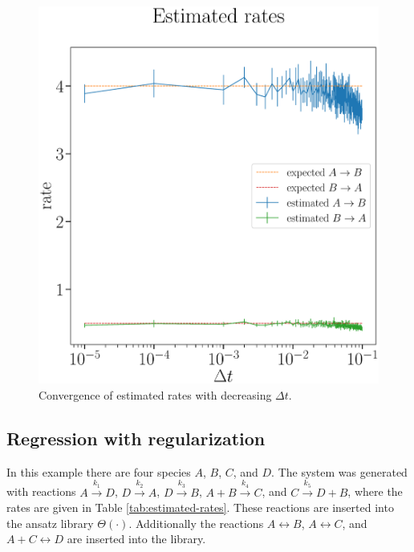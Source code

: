 \documentclass[oneside, abstracton, titlepage]{scrartcl}
\begin{document}
	\begin{figure}
		\begin{center}
			\includegraphics[width=.5\textwidth]{./figures_tex/aux_rates_convergence}
		\end{center}
		\caption{Convergence of estimated rates with decreasing $\Delta t$.}
		\label{ex1:rates-convergence}
	\end{figure}

	\subsection{Regression with regularization}
	\label{sec:ex2}
	In this example there are four species $A$, $B$, $C$, and $D$. The system was generated with reactions $A\xrightarrow{k_1}D$, $D\xrightarrow{k_2}A$, $D\xrightarrow{k_3}B$, $A+B\xrightarrow{k_4}C$, and $C\xrightarrow{k_5}D+B$, where the rates are given in Table \ref{tab:estimated-rates}. These reactions are inserted into the ansatz library $\Theta (\cdot)$. Additionally the reactions $A\leftrightarrow B$, $A\leftrightarrow C$, and $A+C\leftrightarrow D$ are inserted into the library.
\end{document}
